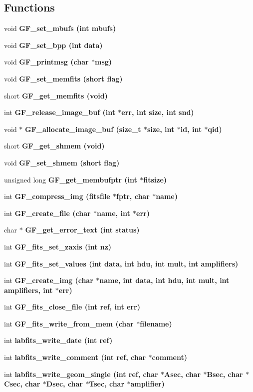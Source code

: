 \subsection*{Functions}
\begin{CompactItemize}
\item 
void \bf{GF\_\-set\_\-mbufs} (int mbufs)
\item 
void \bf{GF\_\-set\_\-bpp} (int data)
\item 
void \bf{GF\_\-printmsg} (char $\ast$msg)
\item 
void \bf{GF\_\-set\_\-memfits} (short flag)
\item 
short \bf{GF\_\-get\_\-memfits} (void)
\item 
int \bf{GF\_\-release\_\-image\_\-buf} (int $\ast$err, int size, int snd)
\item 
void $\ast$ \bf{GF\_\-allocate\_\-image\_\-buf} (size\_\-t $\ast$size, int $\ast$id, int $\ast$qid)
\item 
short \bf{GF\_\-get\_\-shmem} (void)
\item 
void \bf{GF\_\-set\_\-shmem} (short flag)
\item 
unsigned long \bf{GF\_\-get\_\-membufptr} (int $\ast$fitsize)
\item 
int \bf{GF\_\-compress\_\-img} (\bf{fitsfile} $\ast$fptr, char $\ast$name)
\item 
int \bf{GF\_\-create\_\-file} (char $\ast$name, int $\ast$err)
\item 
char $\ast$ \bf{GF\_\-get\_\-error\_\-text} (int status)
\item 
int \bf{GF\_\-fits\_\-set\_\-zaxis} (int nz)
\item 
int \bf{GF\_\-fits\_\-set\_\-values} (int data, int hdu, int mult, int amplifiers)
\item 
int \bf{GF\_\-create\_\-img} (char $\ast$name, int data, int hdu, int mult, int amplifiers, int $\ast$err)
\item 
int \bf{GF\_\-fits\_\-close\_\-file} (int ref, int err)
\item 
int \bf{GF\_\-fits\_\-write\_\-from\_\-mem} (char $\ast$filename)
\item 
int \bf{labfits\_\-write\_\-date} (int ref)
\item 
int \bf{labfits\_\-write\_\-comment} (int ref, char $\ast$comment)
\item 
int \bf{labfits\_\-write\_\-geom\_\-single} (int ref, char $\ast$Asec, char $\ast$Bsec, char $\ast$Csec, char $\ast$Dsec, char $\ast$Tsec, char $\ast$amplifier)
\item 

\end{CompactItemize}
